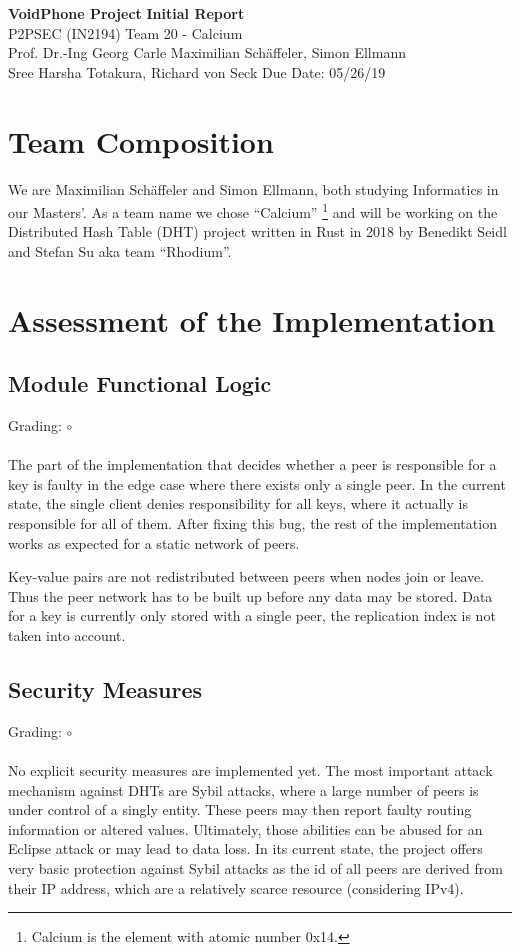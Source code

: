 \documentclass[a4paper, 11pt]{article}
\begin{document}
\noindent
\large\textbf{VoidPhone Project} \hfill \textbf{Initial Report} \\
\normalsize P2PSEC (IN2194)  \hfill Team 20 - Calcium\\
Prof. Dr.-Ing Georg Carle \hfill Maximilian Schäffeler, Simon Ellmann \\
Sree Harsha Totakura, Richard von Seck \hfill Due Date: 05/26/19


\section*{Team Composition}
We are Maximilian Schäffeler and Simon Ellmann, both studying Informatics in our Masters'.
As a team name we chose ``Calcium'' \footnote{Calcium is the element with atomic number 0x14.} and will be working on the Distributed Hash Table (DHT) project written in Rust \cite{Rust} in 2018 by Benedikt Seidl and Stefan Su aka team ``Rhodium''.


\section*{Assessment of the Implementation}
\subsection*{Module Functional Logic}
Grading: $\circ$\\
\\
The part of the implementation that decides whether a peer is responsible for a key is faulty in the edge case where there exists only a single peer.
In the current state, the single client denies responsibility for all keys, where it actually is responsible for all of them.
After fixing this bug, the rest of the implementation works as expected for a static network of peers.

Key-value pairs are not redistributed between peers when nodes join or leave. Thus the peer network has to be built up before any data may be stored.
Data for a key is currently only stored with a single peer, the replication index is not taken into account.

\subsection*{Security Measures}
Grading: $\circ$\\
\\
No explicit security measures are implemented yet.
The most important attack mechanism against DHTs are Sybil attacks, where a large number of peers is under control of a singly entity. 
These peers may then report faulty routing information or altered values. 
Ultimately, those abilities can be abused for an Eclipse attack or may lead to data loss.
In its current state, the project offers very basic protection against Sybil attacks as the id of all peers are derived from their IP address, which are a relatively scarce resource (considering IPv4).
\end{document}
